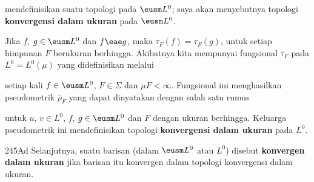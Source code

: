 
\noindent mendefinisikan suatu topologi pada $\eusm L^0$;
saya akan menyebutnya topologi {\bf konvergensi dalam ukuran} pada
$\eusm L^0$.

 Jika $f$, $g\in\eusm L^0$ dan $f\eae g$, maka $\tau_F(f)=\tau_F(g)$, untuk setiap
himpunan $F$ berukuran berhingga. Akibatnya kita mempunyai fungsional
$\bar\tau_F$ pada $L^0=L^0(\mu)$ yang didefinisikan melalui


\noindent setiap kali $f\in\eusm L^0$, $F\in\Sigma$ dan $\mu F<\infty$.
Fungsional ini menghasilkan pseudometrik $\bar\rho_F$ yang dapat dinyatakan
dengan salah satu rumus


\noindent untuk $u$, $v\in L^0$, $f$, $g\in\eusm L^0$ dan $F$ dengan ukuran
berhingga. Keluarga pseudometrik ini mendefinisikan topologi
{\bf konvergensi dalam ukuran} pada $L^0$.

\spheader 245Ad Selanjutnya, suatu barisan (dalam $\eusm L^0$
atau $L^0$) disebut {\bf konvergen dalam ukuran} jika barisan itu konvergen dalam
topologi konvergensi dalam ukuran.

